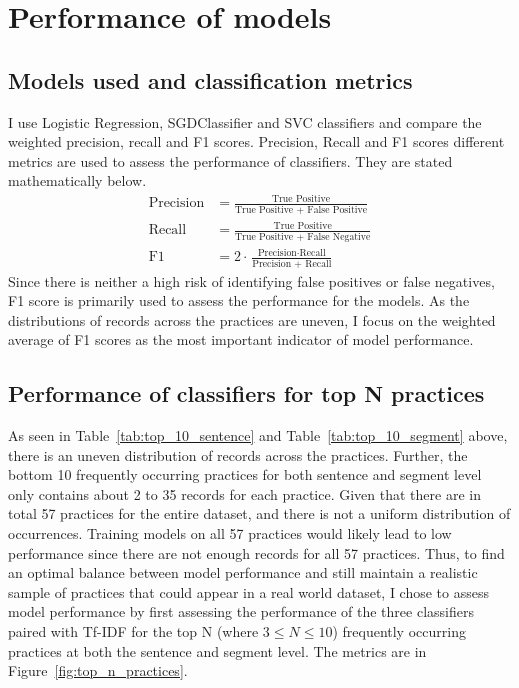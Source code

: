 
\chapter{Performance of models} %

\label{chapter4} %

\section{Models used and classification metrics}
I use Logistic Regression, SGDClassifier and SVC classifiers and compare the weighted precision, recall and F1 scores. Precision, Recall and F1 scores different metrics are used to assess the performance of classifiers. They are stated mathematically below.
\begin{align*}
	\text{Precision} &= \frac{\text{True Positive}}{\text{True Positive + False Positive}} \\
	\text{Recall} &= \frac{\text{True Positive}}{\text{True Positive + False Negative}} \\
	\text{F1} &= 2 \cdot \frac{\text{Precision} \cdot \text{Recall}}{\text{Precision + Recall}}
\end{align*}
Since there is neither a high risk of identifying false positives or false negatives, F1 score is primarily used to assess the performance for the models. As the distributions of records across the practices are uneven, I focus on the weighted average of F1 scores as the most important indicator of model performance. 

\section{Performance of classifiers for top N practices}
As seen in Table~\ref{tab:top_10_sentence} and Table~\ref{tab:top_10_segment} above, there is an uneven distribution of records across the practices. Further, the bottom 10 frequently occurring practices for both sentence and segment level only contains about 2 to 35 records for each practice. Given that there are in total 57 practices for the entire dataset, and there is not a uniform distribution of occurrences. Training models on all 57 practices would likely lead to low performance since there are not enough records for all 57 practices. Thus, to find an optimal balance between model performance and still maintain a realistic sample of practices that could appear in a real world dataset, I chose to assess model performance by first assessing the performance of the three classifiers paired with Tf-IDF for the top N (where $3 \le N \le 10$) frequently occurring practices at both the sentence and segment level. The metrics are in Figure~\ref{fig:top_n_practices}.

